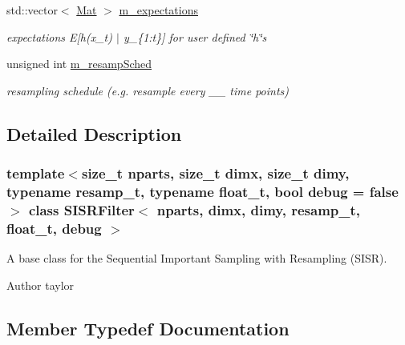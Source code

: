 \begin{DoxyCompactItemize}
\mbox{\label{classSISRFilter_a99b2afa5077165fb02fe41b70c047bb0}} 
std\+::vector$<$ \hyperlink{classSISRFilter_afca4a8c20de84bb2581e500954df0912}{Mat} $>$ \hyperlink{classSISRFilter_a99b2afa5077165fb02fe41b70c047bb0}{m\+\_\+expectations}
\begin{DoxyCompactList}\small\item\em expectations E\mbox{[}h(x\+\_\+t) $\vert$ y\+\_\+\{1\+:t\}\mbox{]} for user defined \char`\"{}h\char`\"{}s \end{DoxyCompactList}\item 
\mbox{\label{classSISRFilter_a61c2704920b97674e6b4f274fc5df9fb}} 
unsigned int \hyperlink{classSISRFilter_a61c2704920b97674e6b4f274fc5df9fb}{m\+\_\+resamp\+Sched}
\begin{DoxyCompactList}\small\item\em resampling schedule (e.\+g. resample every \+\_\+\+\_\+ time points) \end{DoxyCompactList}\end{DoxyCompactItemize}


\subsection{Detailed Description}
\subsubsection*{template$<$size\+\_\+t nparts, size\+\_\+t dimx, size\+\_\+t dimy, typename resamp\+\_\+t, typename float\+\_\+t, bool debug = false$>$\newline
class S\+I\+S\+R\+Filter$<$ nparts, dimx, dimy, resamp\+\_\+t, float\+\_\+t, debug $>$}

A base class for the Sequential Important Sampling with Resampling (S\+I\+SR). 

\begin{DoxyAuthor}{Author}
taylor 
\end{DoxyAuthor}


\subsection{Member Typedef Documentation}
\mbox{\label{classSISRFilter_abe3cebcc32e298af8bcb5651d933e76d}} 
